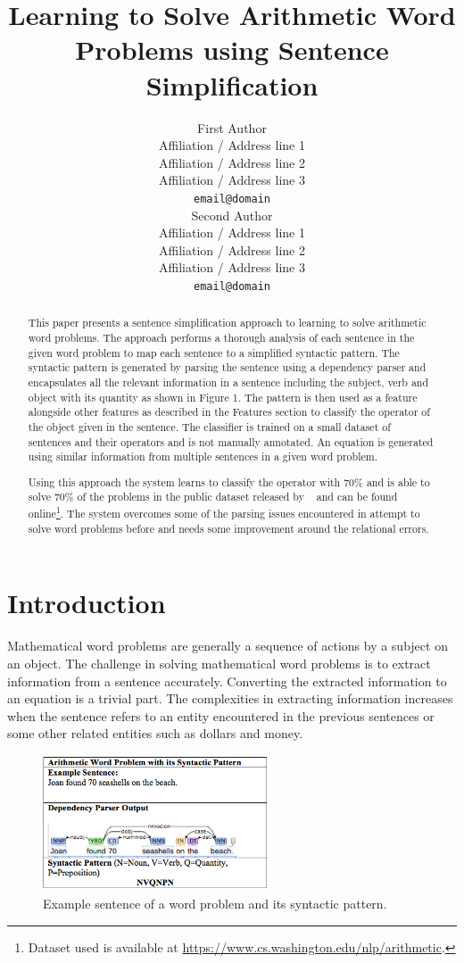 \documentclass[11pt]{article}
\title{Learning to Solve Arithmetic Word Problems using Sentence Simplification}
\author{First Author \\
  Affiliation / Address line 1 \\
  Affiliation / Address line 2 \\
  Affiliation / Address line 3 \\
  {\tt email@domain} \\\And
  Second Author \\
  Affiliation / Address line 1 \\
  Affiliation / Address line 2 \\
  Affiliation / Address line 3 \\
  {\tt email@domain} \\}
\begin{document}
\maketitle
\begin{abstract}
  This paper presents a sentence simplification approach to learning to solve arithmetic word problems. The approach performs a thorough analysis of each sentence in the given word problem to map each sentence to a simplified syntactic pattern. The syntactic pattern is generated by parsing the sentence using a dependency parser and encapsulates all the relevant information in a sentence including the subject, verb and object with its quantity as shown in Figure 1. The pattern is then used as a feature alongside other features as described in the Features section to classify the operator of the object given in the sentence. The classifier is trained on a small dataset of sentences and their operators and is not manually annotated. An equation is generated using similar information from multiple sentences in a given word problem.

  Using this approach the system learns to classify the operator with 70\% and is able to solve 70\% of the problems in the public dataset released by ~\cite{Hosseini:14} and can be found online\footnote{Dataset used is available at \url{https://www.cs.washington.edu/nlp/arithmetic}.}. The system overcomes some of the parsing issues encountered in attempt to solve word problems before and needs some improvement around the relational errors.
\end{abstract}
 
\section{Introduction}
\label{Intro}
Mathematical word problems are generally a sequence of actions by a subject on an object. The challenge in solving mathematical word problems is to extract information from a sentence accurately. Converting the extracted information to an equation is a trivial part. The complexities in extracting information increases when the sentence refers to an entity encountered in the previous sentences or some other related entities such as dollars and money.\newline

\begin{figure}[h]
\includegraphics[width=0.6\textwidth]{Figure1}
\centering
\caption{\label{fig:Figure1}Example sentence of a word problem and its syntactic pattern.}
\end{figure}
\end{document}
